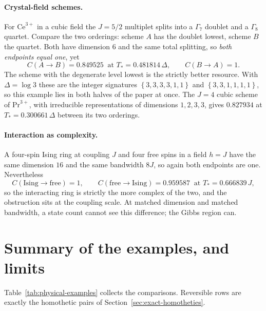 \documentclass[11pt]{article}
\theoremstyle{definition}
\theoremstyle{remark}
\newcommand{\sig}[1]{\left\{#1\right\}}
\begin{document}
\paragraph{Crystal-field schemes.}
For \(\mathrm{Ce}^{3+}\) in a cubic field the \(J=5/2\) multiplet splits into a
\(\Gamma_7\) doublet and a \(\Gamma_8\) quartet.  Compare the two orderings:
scheme \(A\) has the doublet lowest, scheme \(B\) the quartet.  Both have
dimension \(6\) and the same total splitting, so \emph{both endpoints equal
one}, yet
\[
  C(A\to B)=0.849525\ \text{ at }T_*=0.481814\,\Delta,
  \qquad
  C(B\to A)=1 .
\]
The scheme with the degenerate level lowest is the strictly better resource.
With \(\Delta=\log3\) these are the integer signatures
\(\sig{3,3,3,3,1,1}\) and \(\sig{3,3,1,1,1,1}\), so this example lies in both
halves of the paper at once.  The \(J=4\) cubic scheme of
\(\mathrm{Pr}^{3+}\), with irreducible representations of dimensions
\(1,2,3,3\), gives \(0.827934\) at \(T_*=0.300661\,\Delta\) between its two
orderings.

\paragraph{Interaction as complexity.}
A four-spin Ising ring at coupling \(J\) and four free spins in a field \(h=J\)
have the same dimension \(16\) and the same bandwidth \(8J\), so again both
endpoints are one.  Nevertheless
\[
  C(\text{Ising}\to\text{free})=1,
  \qquad
  C(\text{free}\to\text{Ising})=0.959587
  \ \text{ at }T_*=0.666839\,J,
\]
so the interacting ring is strictly the more complex of the two, and the
obstruction sits at the coupling scale.  At matched dimension and matched
bandwidth, a state count cannot see this difference; the Gibbs region can.

\section{Summary of the examples, and limits}
\label{sec:summary}

Table~\ref{tab:physical-examples} collects the comparisons.  Reversible rows
are exactly the homothetic pairs of Section~\ref{sec:exact-homotheties}.
\end{document}
